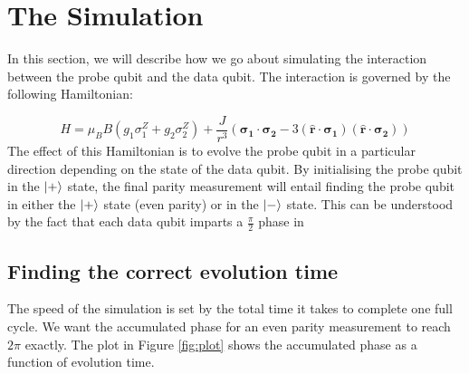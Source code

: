 \section{The Simulation}
In this section, we will describe how we go about simulating the interaction between the probe qubit and the data qubit. The interaction is governed by the following Hamiltonian:

\begin{equation}
H = \mu_B B( g_1 \sigma_1^Z + g_2 \sigma_2^Z) + \frac{J}{r^3} ( \mathbf{\sigma_1} \cdot \mathbf{\sigma_2} - 3 ( \hat{\mathbf{r}} \cdot \mathbf{\sigma_1}) ( \hat{\mathbf{r}}\cdot \mathbf{\sigma_2}))
\end{equation}
The effect of this Hamiltonian is to evolve the probe qubit in a particular direction depending on the state of the data qubit. By initialising the probe qubit in the $\ket{+}$ state, the final parity measurement will entail finding the probe qubit in either the $\ket{+}$ state (even parity) or in the $\ket{-}$ state. This can be understood by the fact that each data qubit imparts a $\frac{\pi}{2}$ phase in 

\subsection{Finding the correct evolution time}
The speed of the simulation is set by the total time it takes to complete one full cycle. We want the accumulated phase for an even parity measurement to reach $2\pi$ exactly. The plot in Figure \ref{fig:plot} shows the accumulated phase as a function of evolution time. 





